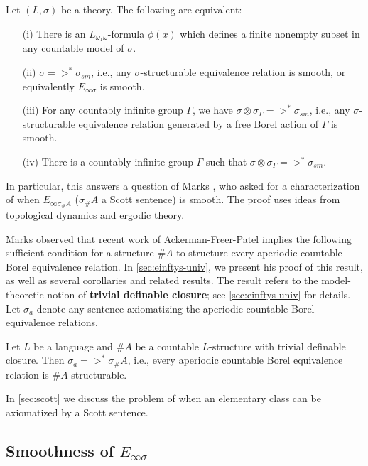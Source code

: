 \documentclass[11pt]{article}
\newcommand*\defn{\textbf}
\begin{document}
\begin{theorem}
\label{thm:einftys-smooth}
Let $(L, \sigma)$ be a theory.  The following are equivalent:
\begin{enumerate}
\item[(i)]  There is an $L_{\omega_1\omega}$-formula $\phi(x)$ which defines a finite nonempty subset in any countable model of $\sigma$.
\item[(ii)]  $\sigma =>^* \sigma_{sm}$, i.e., any $\sigma$-structurable equivalence relation is smooth, or equivalently $E_{\infty\sigma}$ is smooth.
\item[(iii)]  For any countably infinite group $\Gamma$, we have $\sigma \otimes \sigma_\Gamma =>^* \sigma_{sm}$, i.e., any $\sigma$-structurable equivalence relation generated by a free Borel action of $\Gamma$ is smooth.
\item[(iv)]  There is a countably infinite group $\Gamma$ such that $\sigma \otimes \sigma_\Gamma =>^* \sigma_{sm}$.
\end{enumerate}
\end{theorem}

In particular, this answers a question of Marks \cite[end of Section~4.3]{M}, who asked for a characterization of when $E_{\infty\sigma_\#A}$ ($\sigma_\#A$ a Scott sentence) is smooth.  The proof uses ideas from topological dynamics and ergodic theory.

Marks observed that recent work of Ackerman-Freer-Patel \cite{AFP} implies the following sufficient condition for a structure $\#A$ to structure every aperiodic countable Borel equivalence relation.  In \cref{sec:einftys-univ}, we present his proof of this result, as well as several corollaries and related results.  The result refers to the model-theoretic notion of \defn{trivial definable closure}; see \cref{sec:einftys-univ} for details.  Let $\sigma_a$ denote any sentence axiomatizing the aperiodic countable Borel equivalence relations.

\begin{theorem}[Marks]
\label{thm:einftya-univ}
Let $L$ be a language and $\#A$ be a countable $L$-structure with trivial definable closure.  Then $\sigma_a =>^* \sigma_\#A$, i.e., every aperiodic countable Borel equivalence relation is $\#A$-structurable.
\end{theorem}

In \cref{sec:scott} we discuss the problem of when an elementary class can be axiomatized by a Scott sentence.

\subsection{Smoothness of $E_{\infty\sigma}$}
\label{sec:einftys-smooth}
\end{document}
